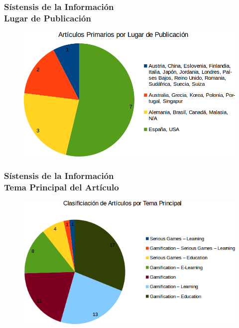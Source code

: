 \documentclass{beamer}
\begin{document}
\begin{frame}
	\frametitle{Sístensis de la Información\\ Lugar de Publicación}
	\begin{figure}
		\begin{center}
			\includegraphics[scale=0.35]{images/1document/PrimariosLugar2.png}
		\end{center}
	\end{figure}
\end{frame}

\begin{frame}
	\frametitle{Sístensis de la Información\\ Tema Principal del Artículo}
	\begin{figure}
		\begin{center}
			\includegraphics[scale=0.55]{images/1document/theme.png}
		\end{center}
	\end{figure}
\end{frame}

\end{document}
